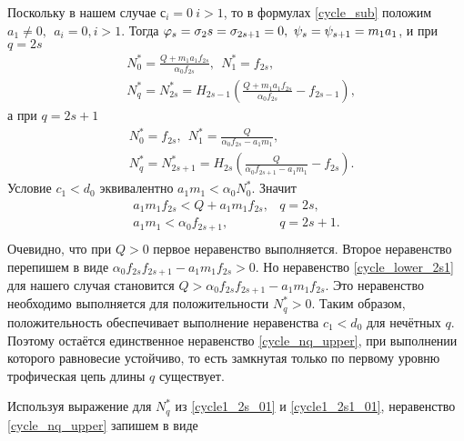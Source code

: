 Поскольку в нашем случае \(с_i = 0 ~ i > 1\), то в формулах \eqref{cycle_sub} положим \(a_1 \neq 0, ~~ a_i = 0, i>1\). Тогда \(\varphi_s = \sigma_2s = \sigma_{2s+1} = 0, ~ \psi_s = \psi_{s+1} = m_1 a_1 \), и при \(q = 2s\)
\begin{equation} \label{cycle1_2s_01}
    \begin{split}
        & N^*_0 = \frac{Q + m_1 a_1 f_{2s}}{\alpha_0 f_{2s}}, ~~ N^*_1 = f_{2s}, \\
        & N^*_q = N^*_{2s} = H_{2s-1} \left( \frac{Q + m_1 a_1 f_{2s}}{\alpha_0 f_{2s}} - f_{2s-1} \right),
    \end{split}
\end{equation}
а при \(q = 2s+1\)
\begin{equation} \label{cycle1_2s1_01}
    \begin{split}
        & N^*_0 = f_{2s}, ~~ N^*_1 = \frac{Q}{\alpha_0 f_{2s} - a_1 m_1}, \\
        & N^*_q = N^*_{2s+1} = H_{2s} \left( \frac{Q}{\alpha_0 f_{2s+1} - a_1 m_1} - f_{2s} \right).
    \end{split}
\end{equation}
Условие \( c_1 < d_0 \) эквивалентно \( a_1 m_1 < \alpha_0 N^*_0 \). Значит
\begin{equation*}
    \begin{matrix}
        a_1 m_1 f_{2s} < Q + a_1 m_1 f_{2s}, & q = 2s, \\
        a_1 m_1 < \alpha_0 f_{2s+1}, & q = 2s+1. \\
    \end{matrix}
\end{equation*}
Очевидно, что при \( Q > 0 \) первое неравенство выполняется. Второе неравенство перепишем в виде \( \alpha_0 f_{2s} f_{2s+1} - a_1 m_1 f_{2s} > 0 \). Но неравенство \eqref{cycle_lower_2s1} для нашего случая становится \( Q > \alpha_0 f_{2s} f_{2s+1} - a_1 m_1 f_{2s} \). Это неравенство необходимо выполняется для положительности \(N^*_q > 0\). Таким образом, положительность обеспечивает выполнение неравенства \(c_1 < d_0\) для нечётных \(q\). Поэтому остаётся единственное неравенство \eqref{cycle_nq_upper}, при выполнении которого равновесие устойчиво, то есть замкнутая только по первому уровню трофическая цепь длины \(q\) существует.

Используя выражение для \(N^*_q\) из \eqref{cycle1_2s_01} и \eqref{cycle1_2s1_01}, неравенство \eqref{cycle_nq_upper} запишем в виде

